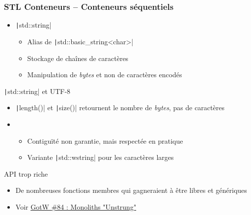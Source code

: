 \documentclass[C++.tex]{subfiles}
\begin{document}
\begin{frame}[fragile]
	\frametitle{STL Conteneurs -- Conteneurs séquentiels}
	\begin{itemize}
		\item \texttt|std::string|
		\begin{itemize}
			\item Alias de \texttt|std::basic_string<char>|
			\item Stockage de chaînes de caractères
			\item Manipulation de \textit{bytes} et non de caractères encodés
		\end{itemize}
	\end{itemize}

	\begin{alertblock}{\texttt|std::string| et UTF-8}
		\begin{itemize}
			\item \texttt|length()| et \texttt|size()| retournent le nombre de \textit{bytes}, pas de caractères
		\end{itemize}
	\end{alertblock}

	\begin{itemize}
		\item [] \begin{itemize}
			\item Contiguïté non garantie, mais respectée en pratique


			\item Variante \texttt|std::wstring| pour les caractères larges
		\end{itemize}
	\end{itemize}

	\begin{alertblock}{API trop riche}
		\begin{itemize}
			\item De nombreuses fonctions membres qui gagneraient à être libres et génériques
			\item Voir \href{http://www.gotw.ca/gotw/084.htm}{GotW \#84 : Monoliths "Unstrung"\linklogo}
		\end{itemize}
	\end{alertblock}
\end{frame}
\end{document}
